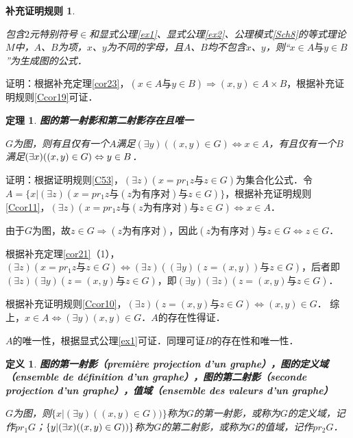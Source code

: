 \documentclass[12pt, a4paper, oneside]{book}
\newtheorem{Ccor}{补充证明规则}
\newtheorem{theo}{定理}
\newtheorem{de}{定义}
\begin{document}
			\begin{Ccor}\label{Ccor20}
				\hfill\par
				包含$2$元特别符号$\in$和显式公理\ref{ex1}、显式公理\ref{ex2}、公理模式\ref{Sch8}的等式理论$M$中，$A$、$B$为项，$x$、$y$为不同的字母，且$A$、$B$均不包含$x$、$y$，则“$x\in A\text{与}y\in B$”为生成图的公式．
			\end{Ccor}
			证明：根据补充定理\ref{cor23}，$(x\in A\text{与}y\in B)\Rightarrow (x, y)\in A\times B$，根据补充证明规则\ref{Ccor19}可证．
			
			\begin{theo}\label{theo11}
				\textbf{图的第一射影和第二射影存在且唯一}
				\par
				$G$为图，则有且仅有一个$A$满足$(\exists y)((x, y)\in G)\Leftrightarrow x\in A$，有且仅有一个$B$满足$(\exists x)\\((x, y)\in G)\Leftrightarrow y\in B$．
			\end{theo}
			证明：根据证明规则\ref{C53}，$(\exists z)(x=pr_1z\text{与}z\in G)$为集合化公式．令$A=\{x|(\exists z)(x=pr_1z\text{与}(z\text{为有序对})\text{与}z\in G)\}$，根据补充证明规则\ref{Ccor11}，$(\exists z)(x=pr_1z\text{与}(z\text{为有序对})\text{与}z\in G)\Leftrightarrow x\in A$．
			\par
			由于$G$为图，故$z\in G\Rightarrow (z\text{为有序对})$，因此$(z\text{为有序对})\text{与}z\in G\Leftrightarrow z\in G$．
			\par
			根据补充定理\ref{cor21}（1），$(\exists z)(x=pr_1z\text{与}z\in G)\Leftrightarrow (\exists z)((\exists y)(z=(x, y))\text{与}z\in G)$，后者即$(\exists z)(\exists y)(z=(x, y)\text{与}z\in G)$，即$(\exists y)(\exists z)(z=(x, y)\text{与}z\in G)$．
			\par
			根据补充证明规则\ref{Ccor10}，$(\exists z)(z=(x, y)\text{与}z\in G)\Leftrightarrow (x, y)\in G$．
			综上，$x\in A\Leftrightarrow (\exists y)(x, y)\in G$．$A$的存在性得证．
			\par
			$A$的唯一性，根据显式公理\ref{ex1}可证．同理可证$B$的存在性和唯一性．

			\begin{de}
				\textbf{图的第一射影（première projection d'un graphe），图的定义域（ensemble de définition d'un graphe），图的第二射影（seconde projection d'un graphe），值域（ensemble des valeurs d'un graphe）}
				\par
				$G$为图，则$\{x|(\exists y)((x, y)\in G))\}$称为$G$的第一射影，或称为$G$的定义域，记作$pr_1G$；$\{y|\\(\exists x)((x, y)\in G))\}$称为$G$的第二射影，或称为$G$的值域，记作$pr_2G$．
			\end{de}
\end{document}

